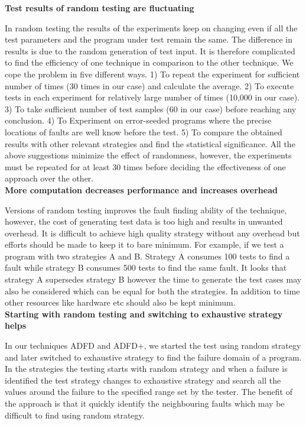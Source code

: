 \textbf{Test results of random testing are fluctuating} 

In random testing the results of the experiments keep on changing even if all the test parameters and the program under test remain the same. The difference in results is due to the random generation of test input. It is therefore complicated to find the efficiency of one technique in comparison to the other technique. We cope the problem in five different ways. 1) To repeat the experiment for sufficient number of times (30 times in our case) and calculate the average. 2) To execute tests in each experiment for relatively large number of times (10,000 in our case). 3) To take sufficient number of test samples (60 in our case) before reaching any conclusion. 4) To Experiment on error-seeded programs where the precise locations of faults are well know before the test. 5) To compare the obtained results with other relevant strategies and find the statistical significance. All the above suggestions minimize the effect of randomness, however, the experiments must be repeated for at least 30 times before deciding the effectiveness of one approach over the other.\\

   
\textbf{More computation decreases performance and increases overhead}

Versions of random testing \cite{} improves the fault finding ability of the technique, however, the cost of generating test data is too high and results in unwanted overhead. It is difficult to achieve high quality strategy without any overhead but efforts should be made to keep it to bare minimum. For example, if we test a program with two strategies A and B. Strategy A consumes 100 tests to find a fault while strategy B consumes 500 tests to find the same fault.  It looks that strategy A supersedes strategy B however the time to generate the test cases may also be considered which can be equal for both the strategies. In addition to time other resources like hardware etc should also be kept minimum.\\


\textbf{Starting with random testing and switching to exhaustive strategy helps}

In our techniques ADFD and ADFD+, we started the test using random strategy and later switched to exhaustive strategy to find the failure domain of a program. In the strategies the testing starts with random strategy and when a failure is identified the test strategy changes to exhaustive strategy and search all the values around the failure to the specified range set by the tester. The benefit of the approach is that it quickly identify the neighbouring faults which may be difficult to find using random strategy. \\


